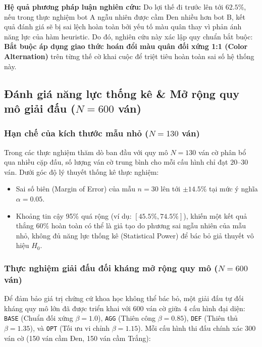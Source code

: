 \documentclass[11pt,a4paper]{article}
\begin{document}
\textbf{Hệ quả phương pháp luận nghiên cứu:} Do lợi thế đi trước lên tới $62.5\%$, nếu trong thực nghiệm bot A ngẫu nhiên được cầm Đen nhiều hơn bot B, kết quả đánh giá sẽ bị sai lệch hoàn toàn bởi yếu tố màu quân thay vì phản ánh năng lực của hàm heuristic. Do đó, nghiên cứu này xác lập quy chuẩn bắt buộc: \textbf{Bắt buộc áp dụng giao thức hoán đổi màu quân đối xứng 1:1 (Color Alternation)} trên từng thế cờ khai cuộc để triệt tiêu hoàn toàn sai số hệ thống này.

\subsection{Đánh giá năng lực thống kê \& Mở rộng quy mô giải đấu (\texorpdfstring{$N = 600$}{N = 600} ván)}
\label{subsec:large_scale_tournament}
\subsubsection{Hạn chế của kích thước mẫu nhỏ (\texorpdfstring{$N = 130$}{N = 130} ván)}
Trong các thực nghiệm thăm dò ban đầu với quy mô $N = 130$ ván cờ phân bổ qua nhiều cặp đấu, số lượng ván cờ trung bình cho mỗi cấu hình chỉ đạt $20\text{--}30$ ván. Dưới góc độ lý thuyết thống kê thực nghiệm:
\begin{itemize}
    \item Sai số biên (Margin of Error) của mẫu $n = 30$ lên tới $\pm 14.5\%$ tại mức ý nghĩa $\alpha = 0.05$.
    \item Khoảng tin cậy 95\% quá rộng (ví dụ: $[45.5\%, 74.5\%]$), khiến một kết quả thắng $60\%$ hoàn toàn có thể là giả tạo do phương sai ngẫu nhiên của mẫu nhỏ, không đủ năng lực thống kê (Statistical Power) để bác bỏ giả thuyết vô hiệu $H_0$.
\end{itemize}

\subsubsection{Thực nghiệm giải đấu đối kháng mở rộng quy mô (\texorpdfstring{$N = 600$}{N = 600} ván)}
Để đảm bảo giá trị chứng cứ khoa học không thể bác bỏ, một giải đấu tự đối kháng quy mô lớn đã được triển khai với 600 ván cờ giữa 4 cấu hình đại diện: \texttt{BASE} (Chuẩn đối xứng $\beta=1.0$), \texttt{AGG} (Thiên công $\beta=0.85$), \texttt{DEF} (Thiên thủ $\beta=1.35$), và \texttt{OPT} (Tối ưu vi chỉnh $\beta=1.15$). Mỗi cấu hình thi đấu chính xác 300 ván cờ (150 ván cầm Đen, 150 ván cầm Trắng):
\end{document}
